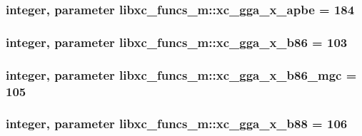 \hypertarget{classlibxc__funcs__m_ad13a9db7e3ad1194e24f0e75f667edac}{
\subsubsection[{xc\-\_\-gga\-\_\-x\-\_\-apbe}]{\setlength{\rightskip}{0pt plus 5cm}integer, parameter libxc\-\_\-funcs\-\_\-m\-::xc\-\_\-gga\-\_\-x\-\_\-apbe = 184}}\label{classlibxc__funcs__m_ad13a9db7e3ad1194e24f0e75f667edac}
\hypertarget{classlibxc__funcs__m_a60c55f78de395edfab27a779122a4dd8}{
\subsubsection[{xc\-\_\-gga\-\_\-x\-\_\-b86}]{\setlength{\rightskip}{0pt plus 5cm}integer, parameter libxc\-\_\-funcs\-\_\-m\-::xc\-\_\-gga\-\_\-x\-\_\-b86 = 103}}\label{classlibxc__funcs__m_a60c55f78de395edfab27a779122a4dd8}
\hypertarget{classlibxc__funcs__m_a75c66bb6804ccec4e91fb33ebf964d8e}{
\subsubsection[{xc\-\_\-gga\-\_\-x\-\_\-b86\-\_\-mgc}]{\setlength{\rightskip}{0pt plus 5cm}integer, parameter libxc\-\_\-funcs\-\_\-m\-::xc\-\_\-gga\-\_\-x\-\_\-b86\-\_\-mgc = 105}}\label{classlibxc__funcs__m_a75c66bb6804ccec4e91fb33ebf964d8e}
\hypertarget{classlibxc__funcs__m_a153ff5fa83a1c87317d79a17f5cf3678}{
\subsubsection[{xc\-\_\-gga\-\_\-x\-\_\-b88}]{\setlength{\rightskip}{0pt plus 5cm}integer, parameter libxc\-\_\-funcs\-\_\-m\-::xc\-\_\-gga\-\_\-x\-\_\-b88 = 106}}\label{classlibxc__funcs__m_a153ff5fa83a1c87317d79a17f5cf3678}
